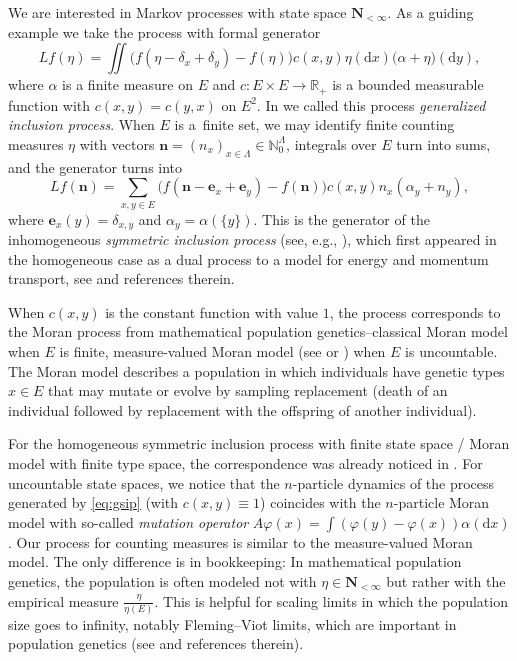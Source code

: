 \documentclass[10pt,a4paper]{amsart}
\numberwithin{equation}{section}
\newcommand{\N}{\mathbb{N}}
\newcommand{\R}{\mathbb{R}}
\newcommand{\dd}{\mathrm{d}} %
\newcommand{\vect}[1]{\boldsymbol{#1}}
\newcommand{\1}{\mathbbm{1}}
\begin{document}
We are interested in Markov processes with state space $\mathbf N_{<\infty}$. As a guiding example we take the process with formal generator
\begin{equation} \label{eq:gsip}
	L f(\eta) = \iint \bigl( f(\eta-\delta_x+\delta_y)- f(\eta)\bigr) c(x,y) \eta(\dd x) \bigl( \alpha+\eta\bigr) (\dd y),
\end{equation}
where $\alpha$ is a finite measure on $E$ and $c\colon E\times E\to \R_+$ is a bounded measurable function with $c(x,y) = c(y,x)$ on $E^2$. In \cite{IntertwiningConsistent} we called this process \emph{generalized inclusion process}. When $E$ is a~finite set, we may identify finite counting measures $\eta$ with vectors $\vect n = (n_x)_{x\in \Lambda}\in \N_0^\Lambda$, integrals over $E$ turn into sums, and the generator turns into
\begin{equation} \label{eq:sip}
	Lf(\vect n) = \sum_{x,y\in E} \bigl( f(\vect n- \vect e_x+\vect e_y) - f(\vect n)\bigr) c(x,y) n_x (\alpha_y+n_y),
\end{equation}
where $\vect e_x(y) = \delta_{x,y}$ and $\alpha_y = \alpha(\{y\})$. This is the generator of the inhomogeneous \emph{symmetric inclusion process} (see, e.g., \cite[equation~(2.2)]{floreani2020orthogonal}), which first appeared in the homogeneous case as a dual process to a model for energy and momentum transport, see \cite{giardina-redig-vafayi2010} and references therein.

When $c(x,y)$ is the constant function with value $1$, the process corresponds to the Moran process from mathematical population genetics--classical Moran model \cite{TransitionMoran,Moran} when $E$ is finite, measure-valued Moran model (see \cite[Section 2.6]{DawsonMeasureValuedMarkovProcesses} or \cite[Section~5.4]{Etheridge00}) when $E$ is uncountable. The Moran model describes a population in which individuals have genetic types $x\in E$ that may mutate or evolve by sampling replacement (death of an individual followed by replacement with the offspring of another individual).

For the homogeneous symmetric inclusion process with finite state space / Moran model with finite type space, the correspondence was already noticed in \cite[Section~5]{carinci2015dualities}. For uncountable state spaces, we notice that the $n$-particle dynamics of the process generated by \eqref{eq:gsip} (with $c(x,y) \equiv 1$) coincides with the $n$-particle Moran model \cite[equation~(2.5.2)]{DawsonMeasureValuedMarkovProcesses} with so-called \emph{mutation operator} $A\varphi(x) = \int( \varphi(y) - \varphi(x)) \alpha(\mathrm d x)$. Our process for counting measures is similar to the measure-valued Moran model. The only difference is in bookkeeping: In mathematical population genetics, the population is often modeled not with $\eta \in \mathbf N_{<\infty}$ but rather with the empirical measure $\frac{\eta}{\eta(E)}$. This is helpful for scaling limits in which the population size goes to infinity, notably Fleming--Viot limits, which are important in population genetics (see \cite{shigaDiffusions} and references therein).
\end{document}
